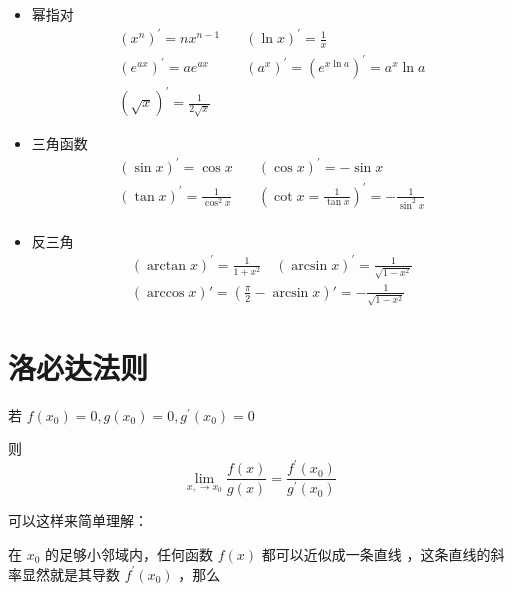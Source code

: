 \documentclass[lang=cn,newtx,10pt,scheme=chinese]{elegantbook}
\begin{document}
\begin{itemize}
  \item 幂指对 \begin{equation}
    \begin{aligned}
      (x^{n})^{\prime }=n x^{n-1} &\quad (\ln x)^{\prime }=\frac{1}{x} \\
      (e^{ax})^{\prime }=ae^{ax} &\quad (a^{x})^{\prime }=(e^{x \ln a})^{\prime }=a^{x} \ln a \\
      (\sqrt{x})^{\prime }=\frac{1}{2 \sqrt{x}} & \quad 
    \end{aligned}
  \end{equation}

  \item 三角函数 
  \begin{equation}
    \begin{aligned}
    (\sin x)^{\prime }=\cos x &\quad (\cos x)^{\prime }=-\sin x\\
    (\tan x)^{\prime }=\frac{1}{\cos ^{2}x} & \quad (\cot x=\frac{1}{\tan x})^{\prime }=-\frac{1}{\sin ^{2}x}\\
    \end{aligned}
  \end{equation}
  \item 反三角
  \begin{equation}
    \begin{aligned}
    (\arctan x)^{\prime }=\frac{1}{1+x^{2}} \quad (\arcsin x)^{\prime }=\frac{1}{\sqrt{1-x^{2}}}  \\
    (\arccos x)'=(\frac{\pi}{2}-\arcsin x)'
=-\frac{1}{\sqrt{1-x^{2}}}    \end{aligned}
  \end{equation}
  
\end{itemize}
\section{洛必达法则}

若 $f(x_0)=0,g(x_0)= 0,g^{\prime }(x_0)=0$

则
\begin{equation}
  \lim_{x,\to x_0} \frac{f(x)}{g(x)}=\frac{f^{\prime }(x_0)}{g^{\prime }(x_0)}
\end{equation}

可以这样来简单理解：

在 $x_0$ 的足够小邻域内，任何函数 $f(x)$ 都可以近似成一条直线
，这条直线的斜率显然就是其导数 $f^{\prime }(x_0)$
，那么
\end{document}
